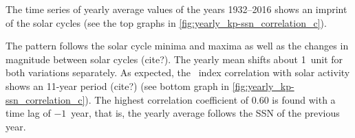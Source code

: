 The time series of yearly average \Kp{} values of the years 1932--2016 shows an imprint of the solar cycles (see the top graphs in \autoref{fig:yearly_kp-ssn_correlation_c}).
\begin{figure}
\end{figure}
The \Kp{} pattern follows the solar cycle minima and maxima as well as the changes in magnitude between solar cycles (cite?). The yearly mean \Kp{} shifts about 1~unit for both variations separately. As expected, the \Kp{}~index correlation with solar activity shows an 11-year period (cite?) (see bottom graph in \autoref{fig:yearly_kp-ssn_correlation_c}). The highest correlation coefficient of 0.60 is found with a time lag of $-1$~year, that is, the yearly average \Kp{} follows the SSN of the previous year.

